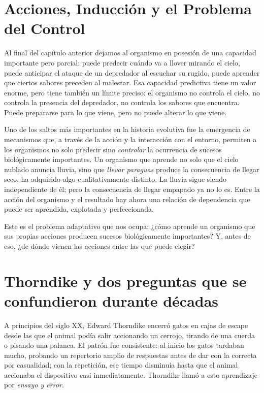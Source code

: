 \documentclass[
  letterpaper,
  DIV=11,
  numbers=noendperiod]{scrreprt}
\begin{document}
\begin{tcolorbox}[enhanced jigsaw, toprule=.15mm, arc=.35mm, colback=white, opacityback=0, colframe=quarto-callout-note-color-frame, breakable, rightrule=.15mm, left=2mm, leftrule=.75mm, bottomrule=.15mm]
\section{Acciones, Inducción y el Problema del
Control}\label{acciones-inducciuxf3n-y-el-problema-del-control}

Al final del capítulo anterior dejamos al organismo en posesión de una
capacidad importante pero parcial: puede predecir cuándo va a llover
mirando el cielo, puede anticipar el ataque de un depredador al escuchar
su rugido, puede aprender que ciertos sabores preceden al malestar. Esa
capacidad predictiva tiene un valor enorme, pero tiene también un límite
preciso: el organismo no controla el cielo, no controla la presencia del
depredador, no controla los sabores que encuentra. Puede prepararse para
lo que viene, pero no puede alterar lo que viene.

Uno de los saltos más importantes en la historia evolutiva fue la
emergencia de mecanismos que, a través de la acción y la interacción con
el entorno, permiten a los organismos no solo predecir sino
\emph{controlar} la ocurrencia de sucesos biológicamente importantes. Un
organismo que aprende no solo que el cielo nublado anuncia lluvia, sino
que \emph{llevar paraguas} produce la consecuencia de llegar seco, ha
adquirido algo cualitativamente distinto. La lluvia sigue siendo
independiente de él; pero la consecuencia de llegar empapado ya no lo
es. Entre la acción del organismo y el resultado hay ahora una relación
de dependencia que puede ser aprendida, explotada y perfeccionada.

Este es el problema adaptativo que nos ocupa: ¿cómo aprende un organismo
que sus propias acciones producen sucesos biológicamente importantes? Y,
antes de eso, ¿de dónde vienen las acciones entre las que puede elegir?

\section{Thorndike y dos preguntas que se confundieron durante
décadas}\label{thorndike-y-dos-preguntas-que-se-confundieron-durante-duxe9cadas}

A principios del siglo XX, Edward Thorndike encerró gatos en cajas de
escape desde las que el animal podía salir accionando un cerrojo,
tirando de una cuerda o pisando una palanca. El patrón fue consistente:
al inicio los gatos tardaban mucho, probando un repertorio amplio de
respuestas antes de dar con la correcta por casualidad; con la
repetición, ese tiempo disminuía hasta que el animal accionaba el
dispositivo casi inmediatamente. Thorndike llamó a esto aprendizaje por
\emph{ensayo y error}.


\end{tcolorbox}
\end{document}
